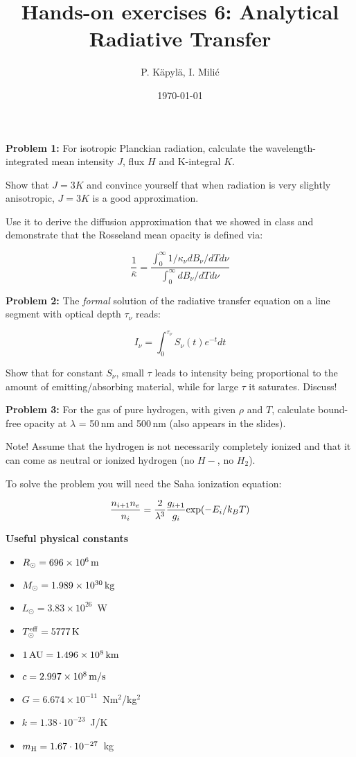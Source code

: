 \documentclass[12pt]{article}
\title{Hands-on exercises 6: Analytical Radiative Transfer}
\author{P. K\"{a}pyl\"{a}, I. Mili\'{c}}
\date{\today}
\begin{document}
\maketitle

{\bf Problem 1:} For isotropic Planckian radiation, calculate the wavelength-integrated mean intensity $J$, flux $H$ and K-integral $K$. 

Show that $J = 3K$ and convince yourself that when radiation is very slightly anisotropic, $J=3K$ is a good approximation. 

Use it to derive the diffusion approximation that we showed in class and demonstrate that the Rosseland mean opacity is defined via:

\begin{equation}
\frac{1}{\overline{\kappa}} = \frac{\int_0^{\infty} 1/\kappa_\nu dB_\nu / dT d\nu}{\int_0^{\infty} dB_\nu / dT d\nu}
\end{equation}

{\bf Problem 2:} The \emph{formal} solution of the radiative transfer equation on a line segment with optical depth $\tau_\nu$ reads: 

\begin{equation}
I_\nu = \int_0^{\tau_\nu} S_\nu(t) e^{-t} dt
\end{equation}

Show that for constant $S_\nu$, small $\tau$ leads to intensity being proportional to the amount of emitting/absorbing material, while for large $\tau$ it saturates. Discuss!

{\bf Problem 3:} For the gas of pure hydrogen, with given $\rho$ and $T$, calculate bound-free opacity at $\lambda$ = 50\,nm and 500\,nm (also appears in the slides).

Note! Assume that the hydrogen is not necessarily completely ionized and that it can come as neutral or ionized hydrogen (no $H-$, no $H_2$). 

To solve the problem you will need the Saha ionization equation: 

\begin{equation}
\frac{n_{i+1} n_e}{n_i} = \frac{2}{\lambda^3} \frac{g_{i+1}}{g_i} {\rm exp}(-E_i / k_B T)
\end{equation}



{\bf Useful physical constants}
\begin{itemize}
  \item $R_{\odot} = 696 \times 10^6\,{\rm m}$
  \item $M_{\odot} = 1.989 \times 10^{30}\,{\rm kg}$
  \item $L_{\odot} = 3.83 \times 10^{26}$~W
  \item $T^{\rm eff}_{\odot} = 5777\,{\rm K}$
  \item $1\,{\rm AU} = 1.496 \times 10^8\,{\rm km}$
  \item $c = 2.997 \times 10^8\,{\rm m/s}$
  \item $G = 6.674 \times 10^{-11}$~Nm$^2$/kg$^2$
  \item $k = 1.38\cdot10^{-23}$~J/K
  \item $m_{\rm H} = 1.67\cdot10^{-27}$~kg
\end{itemize}
\end{document}

